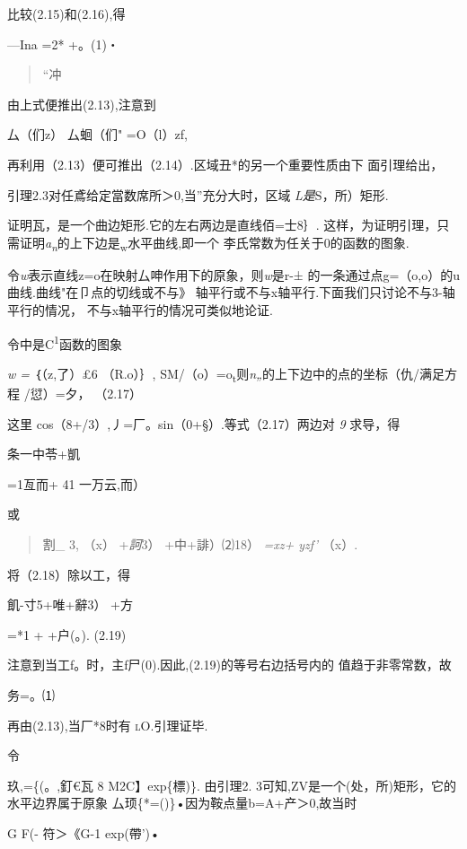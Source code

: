 \documentclass{article}
\begin{document}
比较(2.15)和(2.16),得

---Ina =2* +。(1)・

\begin{quote}
``冲
\end{quote}

由上式便推出(2.13),注意到

\textbar{}\textbar{} 厶（们z）\textbar{}\textbar{} 厶蛔（们"\textbar{}
=O（l）\textbar{}z\textbar{}f,

再利用（2.13）便可推出（2.14）.区域丑*的另一个重要性质由下 面引理给出，

引理2.3对任鳶给定當数席所＞0,当''充分大时，区域 \emph{L是}S，所）矩形.

证明瓦，是一个曲边矩形.它的左右两边是直线佰=士8｝.
这样，为证明引理，只需证明\emph{a\textsubscript{n}}的上下边是\textsubscript{w}水平曲线,即一个
李氏常数为任关于0的函数的图象.

令\emph{w}表示直线z=o在映射厶呻作用下的原象，则\emph{w}是r-±
的一条通过点g=（o,o）的u曲线.曲线"在卩点的切线或不与》
轴平行或不与x轴平行.下面我们只讨论不与3-轴平行的情况，
不与x轴平行的情况可类似地论证.

令中是C\textsuperscript{1}函数的图象

\emph{w =} ｛（z,了）£6 （R.o）｝,
SM/（o）=o\textsubscript{t}则\emph{n„}的上下边中的点的坐标（仇/满足方程
/愆）=夕， （2.17）

这里 cos（8+/3）,丿=厂。sin（0+§）.等式（2.17）两边对 \emph{9} 求导，得

条一中苓+凱

=1亙而+ 41 一万云,而）

或

\begin{quote}
割\_ 3, （x） +\emph{訶}3） +中+誹）⑵18） \emph{=xz+ yzf'} （x）.
\end{quote}

将（2.18）除以工，得

飢-寸5+唯+辭3） +方

=*1 + +户(。). (2.19)

注意到当工f。时，主f尸(0).因此,(2.19)的等号右边括号内的
值趋于非零常数，故

务=。⑴

再由(2.13),当厂*8时有 \textsc{lO.}引理证毕.\textbar{}

令

玖,=\{(。,釘€瓦 \textbar{}8\textbar{} M2C】exp\{標)\}. 由引理2.
3可知,ZV是一个(处，所)矩形，它的水平边界属于原象
厶顼\{*=()\}•因为鞍点量b=A+产＞0,故当时

G F(- 符＞《G-1 exp(帶')•
\end{document}
